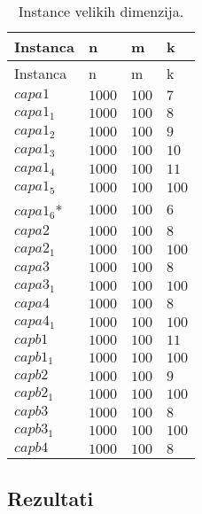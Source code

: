 \documentclass[a4paper]{article}
\begin{document}
\begin{longtabu} to 1\textwidth{|  X[2] | X  X  X  }\caption{Instance velikih dimenzija.\label{instancetable}}\\ Instanca & n & m &k \\\hline\endfirsthead  \endfoot Instanca & n & m &k \\\hline\endhead\hline\endlastfoot $capa1$& $1000$ & $100$ & $7$\\ 
$capa1_1$& $1000$ & $100$ & $8$\\ 
$capa1_2$& $1000$ & $100$ & $9$\\ 
$capa1_3$& $1000$ & $100$ & $10$\\ 
$capa1_4$& $1000$ & $100$ & $11$\\ 
$capa1_5$& $1000$ & $100$ & $100$\\ 
$capa1_6$*& $1000$ & $100$ & $6$\\ 
$capa2$& $1000$ & $100$ & $8$\\ 
$capa2_1$& $1000$ & $100$ & $100$\\ 
$capa3$& $1000$ & $100$ & $8$\\ 
$capa3_1$& $1000$ & $100$ & $100$\\ 
$capa4$& $1000$ & $100$ & $8$\\ 
$capa4_1$& $1000$ & $100$ & $100$\\ 
$capb1$& $1000$ & $100$ & $11$\\ 
$capb1_1$& $1000$ & $100$ & $100$\\ 
$capb2$& $1000$ & $100$ & $9$\\ 
$capb2_1$& $1000$ & $100$ & $100$\\ 
$capb3$& $1000$ & $100$ & $8$\\ 
$capb3_1$& $1000$ & $100$ & $100$\\ 
$capb4$& $1000$ & $100$ & $8$\\ 
\end{longtabu}
\subsection{Rezultati}
\end{document}
